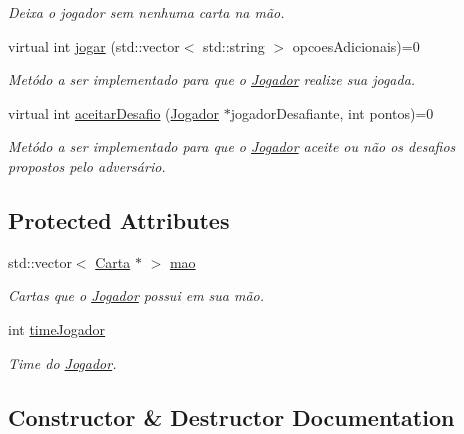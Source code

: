 \begin{DoxyCompactItemize}
\begin{DoxyCompactList}\small\item\em Deixa o jogador sem nenhuma carta na mão. \end{DoxyCompactList}\item 
virtual int \mbox{\hyperlink{class_jogador_a8af760d8531f7d4e78fc767adcff0cb6}{jogar}} (std\+::vector$<$ std\+::string $>$ opcoes\+Adicionais)=0
\begin{DoxyCompactList}\small\item\em Metódo a ser implementado para que o \mbox{\hyperlink{class_jogador}{Jogador}} realize sua jogada. \end{DoxyCompactList}\item 
virtual int \mbox{\hyperlink{class_jogador_a4eceb45cff559f97cd441da30d36769c}{aceitar\+Desafio}} (\mbox{\hyperlink{class_jogador}{Jogador}} $\ast$jogador\+Desafiante, int pontos)=0
\begin{DoxyCompactList}\small\item\em Metódo a ser implementado para que o \mbox{\hyperlink{class_jogador}{Jogador}} aceite ou não os desafios propostos pelo adversário. \end{DoxyCompactList}\end{DoxyCompactItemize}
\subsection*{Protected Attributes}
\begin{DoxyCompactItemize}
\item 
std\+::vector$<$ \mbox{\hyperlink{class_carta}{Carta}} $\ast$ $>$ \mbox{\hyperlink{class_jogador_ad989cab8e9aa172ddb6ed89d019a7e91}{mao}}
\begin{DoxyCompactList}\small\item\em Cartas que o \mbox{\hyperlink{class_jogador}{Jogador}} possui em sua mão. \end{DoxyCompactList}\item 
int \mbox{\hyperlink{class_jogador_a799f588b8a5c2504c6a290e617983808}{time\+Jogador}}
\begin{DoxyCompactList}\small\item\em Time do \mbox{\hyperlink{class_jogador}{Jogador}}. \end{DoxyCompactList}\end{DoxyCompactItemize}


\subsection{Constructor \& Destructor Documentation}
\mbox{\label{class_jogador_a166616aae3af6eefcc804a70d70f1359}} 
